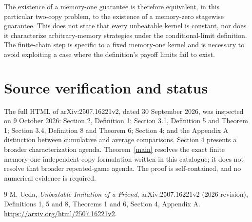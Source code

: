\documentclass[11pt]{article}
\theoremstyle{remark}
\begin{document}
The existence of a memory-one guarantee is therefore equivalent, in this particular two-copy problem, to the existence of a memory-zero stagewise guarantee. This does not state that every unbeatable kernel is constant, nor does it characterize arbitrary-memory strategies under the conditional-limit definition. The finite-chain step is specific to a fixed memory-one kernel and is necessary to avoid exploiting a case where the definition's payoff limits fail to exist.

\section{Source verification and status}
The full HTML of arXiv:2507.16221v2, dated 30 September 2026, was inspected on 9 October 2026: Section 2, Definition 1; Section 3.1, Definition 5 and Theorem 1; Section 3.4, Definition 8 and Theorem 6; Section 4; and the Appendix A distinction between cumulative and average comparisons. Section 4 presents a broader characterization agenda. Theorem~\ref{main} resolves the exact finite memory-one independent-copy formulation written in this catalogue; it does not resolve that broader repeated-game agenda. The proof is self-contained, and no numerical evidence is required.

\begin{thebibliography}{9}
 M. Ueda, \emph{Unbeatable Imitation of a Friend}, arXiv:2507.16221v2 (2026 revision), Definitions 1, 5 and 8, Theorems 1 and 6, Section 4, Appendix A. \url{https://arxiv.org/html/2507.16221v2}.
\end{thebibliography}
\end{document}
